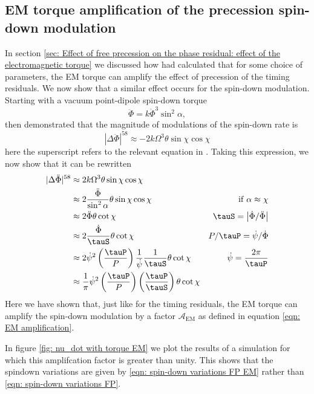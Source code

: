 \documentclass[/home/greg/Thesis/main/main.tex]{subfiles}
\begin{document}
\subsection{EM torque amplification of the precession spin-down modulation}
In section \ref{sec: Effect of free precession on the phase residual: effect of the 
electromagnetic torque} we discussed how \citet{Jones2001} had calculated that
for some choice of parameters, the EM torque can amplify the effect of precession
of the timing residuals. We now show that a similar effect occurs for the 
spin-down modulation. Starting with a vacuum point-dipole spin-down torque
\begin{equation}
    \ddot{\Phi} = k\dot{\Phi}^{3}\sin^{2}\alpha,
\end{equation}
then \citet{Jones2001} demonstrated that the magnitude of modulations of the 
spin-down rate is
\begin{equation}
    |\Delta\ddot{\Phi}|^{58} \approx -2k\Omega^{3} \theta \sin\chi \cos\chi 
\end{equation}
here the superscript refers to the relevant equation in \citet{Jones2001}. Taking
this expression, we now show that it can be rewritten
\begin{align}
    |\Delta\ddot{\Phi}|^{58} 
    & \approx 2k\Omega^{3} \theta \sin\chi \cos\chi & \\
    & \approx 2 \frac{\ddot{\Phi}}{\sin^{2}\alpha} \theta \sin\chi\cos\chi &
    \mathrm{if }\; \alpha \approx \chi \\
    & \approx 2 \ddot{\Phi}\theta \cot\chi & 
    \tauS = \left| \dot{\Phi} / \ddot{\Phi}\right| \\
    & \approx 2 \frac{\dot{\Phi}}{\tauS} \theta \cot\chi &
    P/\tauP = \dot{\psi}/\dot{\Phi} \\
    & \approx 2 \dot{\psi}^{2}\left(\frac{\tauP}{P}\right) \frac{1}{\dot{\psi}} \frac{1}{\tauS} \theta \cot \chi & \dot{\psi} = \frac{2\pi}{\tauP} \\
    & \approx \frac{1}{\pi}\dot{\psi}^{2}\left(\frac{\tauP}{P}\right)\left(\frac{\tauP}{\tauS}\right) \theta \cot\chi
    \label{eqn: spin-down variations FP EM}
\end{align}
Here we have shown that, just like for the timing residuals, the EM torque can
amplify the spin-down modulation by a factor $\mathcal{A}_{\mathrm{EM}}$ as defined
in equation \eqref{eqn: EM amplification}.

In figure \ref{fig: nu_dot with torque EM} we plot the results of a simulation
for which this amplifcation factor is greater than unity. This shows that the
spindown variations are given by \ref{eqn: spin-down variations FP EM} rather
than \eqref{eqn: spin-down variations FP}.
\end{document}

